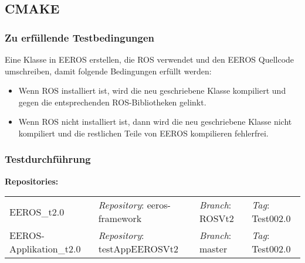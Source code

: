 \subsection{CMAKE}
\subsubsection{Zu erfüllende Testbedingungen}
Eine Klasse in EEROS erstellen, die ROS verwendet und den EEROS Quellcode umschreiben, damit folgende Bedingungen erfüllt werden:
\begin{itemize}
\item Wenn ROS installiert ist, wird die neu geschriebene Klasse kompiliert und gegen die entsprechenden ROS-Bibliotheken gelinkt.
\item Wenn ROS nicht installiert ist, dann wird die neu geschriebene Klasse nicht kompiliert und die restlichen Teile von EEROS kompilieren fehlerfrei.
\end{itemize}

\subsubsection{Testdurchführung}
\textbf{Repositories:} \\
\begin{tabular}
  { l						| l			 							l								 l								}

  EEROS\_t2.0				& \textit{Repository}: eeros-framework	& \textit{Branch}: ROSVt2		& \textit{Tag}: Test002.0 		\\
  EEROS-Applikation\_t2.0	& \textit{Repository}: testAppEEROSVt2	& \textit{Branch}: master		& \textit{Tag}: Test002.0 		\\
\end{tabular}

